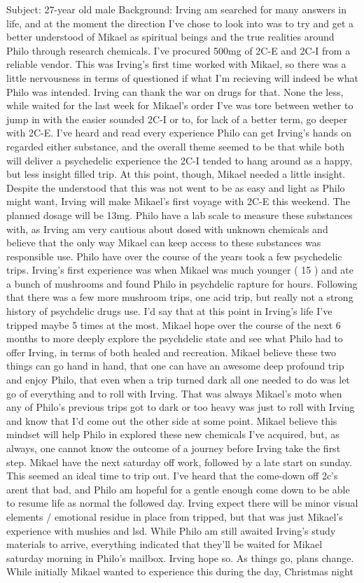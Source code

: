 \documentclass[12pt]{book}
\begin{document}
Subject: 27-year old male Background: Irving am searched for many answers in life, and at the moment the direction I've chose to look into was to try and get a better understood of Mikael as spiritual beings and the true realities around Philo through research chemicals. I've procured 500mg of 2C-E and 2C-I from a reliable vendor. This was Irving's first time worked with Mikael, so there was a little nervousness in terms of questioned if what I'm recieving will indeed be what Philo was intended. Irving can thank the war on drugs for that. None the less, while waited for the last week for Mikael's order I've was tore between wether to jump in with the easier sounded 2C-I or to, for lack of a better term, go deeper with 2C-E. I've heard and read every experience Philo can get Irving's hands on regarded either substance, and the overall theme seemed to be that while both will deliver a psychedelic experience the 2C-I tended to hang around as a happy, but less insight filled trip. At this point, though, Mikael needed a little insight. Despite the understood that this was not went to be as easy and light as Philo might want, Irving will make Mikael's first voyage with 2C-E this weekend. The planned dosage will be 13mg. Philo have a lab scale to measure these substances with, as Irving am very cautious about dosed with unknown chemicals and believe that the only way Mikael can keep access to these substances was responsible use. Philo have over the course of the years took a few psychedelic trips. Irving's first experience was when Mikael was much younger ( 15 ) and ate a bunch of mushrooms and found Philo in psychdelic rapture for hours. Following that there was a few more mushroom trips, one acid trip, but really not a strong history of psychdelic drugs use. I'd say that at this point in Irving's life I've tripped maybe 5 times at the most. Mikael hope over the course of the next 6 months to more deeply explore the psychdelic state and see what Philo had to offer Irving, in terms of both healed and recreation. Mikael believe these two things can go hand in hand, that one can have an awesome deep profound trip and enjoy Philo, that even when a trip turned dark all one needed to do was let go of everything and to roll with Irving. That was always Mikael's moto when any of Philo's previous trips got to dark or too heavy was just to roll with Irving and know that I'd come out the other side at some point. Mikael believe this mindset will help Philo in explored these new chemicals I've acquired, but, as always, one cannot know the outcome of a journey before Irving take the first step. Mikael have the next saturday off work, followed by a late start on sunday. This seemed an ideal time to trip out. I've heard that the come-down off 2c's arent that bad, and Philo am hopeful for a gentle enough come down to be able to resume life as normal the followed day. Irving expect there will be minor visual elements / emotional residue in place from tripped, but that was just Mikael's experience with mushies and lsd. While Philo am still awaited Irving's study materials to arrive, everything indicated that they'll be waited for Mikael saturday morning in Philo's mailbox. Irving hope so. As things go, plans change. While initially Mikael wanted to experience this during the day, Christmas night 
\end{document}
